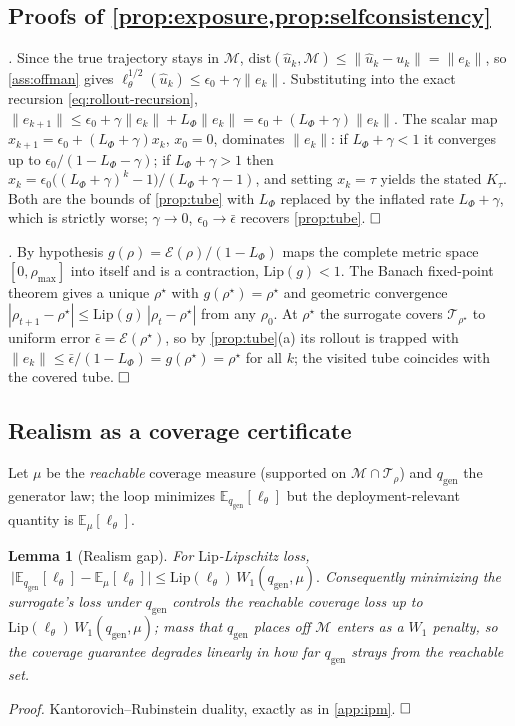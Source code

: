 \documentclass{article}
\theoremstyle{plain}
\newtheorem{lemma}{Lemma}
\theoremstyle{definition}
\theoremstyle{remark}
\newcommand{\E}{\mathbb{E}}
\newcommand{\state}{u}
\newcommand{\manifold}{\mathcal{M}}
\newcommand{\sol}{\Phi}
\newcommand{\lossf}{\ell_\theta}
\newcommand{\qgen}{q_{\mathrm{gen}}}
\newcommand{\tube}{\mathcal{T}_{\rho}}
\newcommand{\Lip}{\mathrm{Lip}}
\newcommand{\dist}{\mathrm{dist}}
\begin{document}
\subsection{Proofs of \cref{prop:exposure,prop:selfconsistency}}\label{app:rolloutdeep}
\emph{.} Since the true trajectory stays in $\manifold$,
$\dist(\hat\state_k,\manifold)\le\|\hat\state_k-\state_k\|=\|e_k\|$, so \cref{ass:offman} gives
$\lossf^{1/2}(\hat\state_k)\le\epsilon_0+\gamma\|e_k\|$. Substituting into the exact recursion
\eqref{eq:rollout-recursion}, $\|e_{k+1}\|\le\epsilon_0+\gamma\|e_k\|+L_{\sol}\|e_k\|
=\epsilon_0+(L_{\sol}+\gamma)\|e_k\|$. The scalar map $x_{k+1}=\epsilon_0+(L_{\sol}+\gamma)x_k$, $x_0=0$,
dominates $\|e_k\|$: if $L_{\sol}+\gamma<1$ it converges up to $\epsilon_0/(1-L_{\sol}-\gamma)$; if
$L_{\sol}+\gamma>1$ then $x_k=\epsilon_0\big((L_{\sol}+\gamma)^k-1\big)/(L_{\sol}+\gamma-1)$, and setting
$x_k=\tau$ yields the stated $K_\tau$. Both are the bounds of \cref{prop:tube} with $L_{\sol}$ replaced by
the inflated rate $L_{\sol}+\gamma$, which is strictly worse; $\gamma\to0$, $\epsilon_0\to\bar\epsilon$
recovers \cref{prop:tube}. $\hfill\square$

\emph{.} By hypothesis $g(\rho)=\mathcal E(\rho)/(1-L_{\sol})$ maps the complete
metric space $[0,\rho_{\max}]$ into itself and is a contraction, $\mathrm{Lip}(g)<1$. The Banach
fixed-point theorem gives a unique $\rho^\star$ with $g(\rho^\star)=\rho^\star$ and geometric convergence
$|\rho_{t+1}-\rho^\star|\le\mathrm{Lip}(g)\,|\rho_t-\rho^\star|$ from any $\rho_0$. At $\rho^\star$ the
surrogate covers $\mathcal T_{\rho^\star}$ to uniform error $\bar\epsilon=\mathcal E(\rho^\star)$, so by
\cref{prop:tube}(a) its rollout is trapped with $\|e_k\|\le\bar\epsilon/(1-L_{\sol})=g(\rho^\star)=\rho^\star$
for all $k$; the visited tube coincides with the covered tube. $\hfill\square$

\subsection{Realism as a coverage certificate}\label{app:realism}
Let $\mu$ be the \emph{reachable} coverage measure (supported on $\manifold\cap\tube$) and $\qgen$ the
generator law; the loop minimizes $\E_{\qgen}[\lossf]$ but the deployment-relevant quantity is
$\E_{\mu}[\lossf]$.
\begin{lemma}[Realism gap]\label{lem:realism}
For $\Lip$-Lipschitz loss, $\ \big|\E_{\qgen}[\lossf]-\E_{\mu}[\lossf]\big|\le\Lip(\lossf)\,W_1(\qgen,\mu).$
Consequently minimizing the surrogate's loss under $\qgen$ controls the reachable coverage loss up to
$\Lip(\lossf)\,W_1(\qgen,\mu)$; mass that $\qgen$ places off $\manifold$ enters as a $W_1$ penalty, so the
coverage guarantee degrades \emph{linearly} in how far $\qgen$ strays from the reachable set.
\end{lemma}
\emph{Proof.} Kantorovich--Rubinstein duality, exactly as in \cref{app:ipm}. $\hfill\square$
\end{document}
